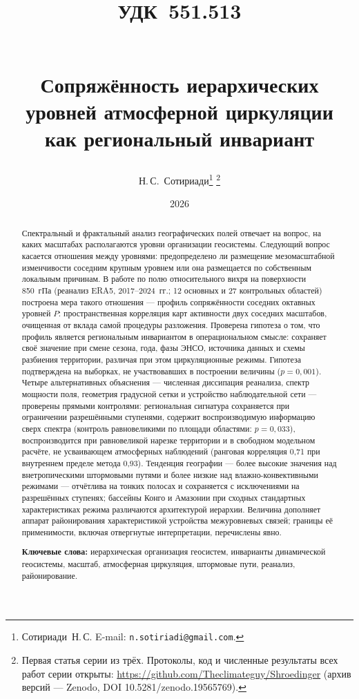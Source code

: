 \documentclass[11pt,a4paper]{article}
\title{{\normalsize\normalfont\hspace*{-\leftskip}\parbox{\linewidth}{\raggedright УДК~551.513}}\\[1.5em]
Сопряжённость иерархических уровней атмосферной циркуляции\\
как региональный инвариант}
\author{Н.\,С.~Сотириади\thanks{Сотириади~Н.\,С. E-mail: \texttt{n.sotiriadi@gmail.com}.}%
\thanks{Первая статья серии из трёх. Протоколы, код и численные результаты всех работ серии открыты: \url{https://github.com/Theclimateguy/Shroedinger} (архив версий --- Zenodo, DOI 10.5281/zenodo.19565769).}}
\date{2026}
\begin{document}
\maketitle

\begin{abstract}
Спектральный и фрактальный анализ географических полей отвечает на вопрос, на каких масштабах располагаются уровни организации геосистемы. Следующий вопрос касается отношения между уровнями: предопределено ли размещение мезомасштабной изменчивости соседним крупным уровнем или она размещается по собственным локальным причинам. В работе по полю относительного вихря на поверхности 850~гПа (реанализ ERA5, 2017--2024~гг.; 12 основных и 27 контрольных областей) построена мера такого отношения --- профиль сопряжённости соседних октавных уровней $P$: пространственная корреляция карт активности двух соседних масштабов, очищенная от вклада самой процедуры разложения. Проверена гипотеза о том, что профиль является региональным инвариантом в операциональном смысле: сохраняет своё значение при смене сезона, года, фазы ЭНСО, источника данных и схемы разбиения территории, различая при этом циркуляционные режимы. Гипотеза подтверждена на выборках, не участвовавших в построении величины ($p=0{,}001$). Четыре альтернативных объяснения --- численная диссипация реанализа, спектр мощности поля, геометрия градусной сетки и устройство наблюдательной сети --- проверены прямыми контролями: региональная сигнатура сохраняется при ограничении разрешёнными ступенями, содержит воспроизводимую информацию сверх спектра (контроль равновеликими по площади областями: $p=0{,}033$), воспроизводится при равновеликой нарезке территории и в свободном модельном расчёте, не усваивающем атмосферных наблюдений (ранговая корреляция 0,71 при внутреннем пределе метода 0,93). Тенденция географии --- более высокие значения над внетропическими штормовыми путями и более низкие над влажно-конвективными режимами --- отчётлива на тонких полосах и сохраняется с исключениями на разрешённых ступенях; бассейны Конго и Амазонии при сходных стандартных характеристиках режима различаются архитектурой иерархии. Величина дополняет аппарат районирования характеристикой устройства межуровневых связей; границы её применимости, включая отвергнутые интерпретации, перечислены явно.

\smallskip
\noindent\textbf{Ключевые слова:} иерархическая организация геосистем, инварианты динамической геосистемы, масштаб, атмосферная циркуляция, штормовые пути, реанализ, районирование.
\end{abstract}
\end{document}
